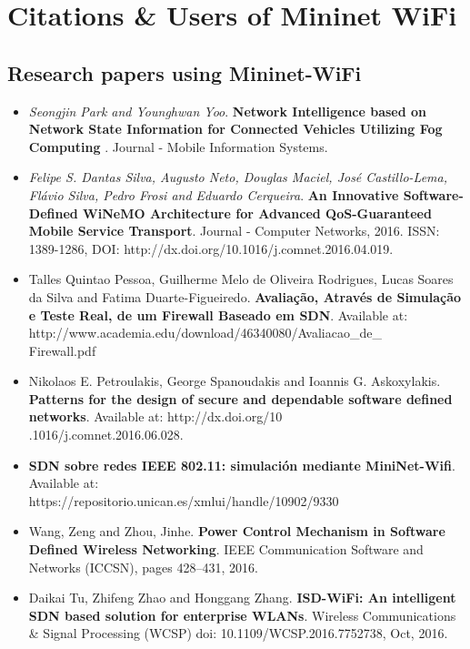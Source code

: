 \chapter{Citations \& Users of Mininet WiFi}

\section{Research papers using Mininet-WiFi}

\begin{itemize}
\item \textit{Seongjin Park and Younghwan Yoo}. \textbf{Network Intelligence based on Network State Information for Connected Vehicles Utilizing Fog Computing
}. Journal - Mobile Information Systems.
\\
\item \textit{Felipe S. Dantas Silva, Augusto Neto, Douglas Maciel, José Castillo-Lema, Flávio Silva, Pedro Frosi and Eduardo Cerqueira}. \textbf{An Innovative Software-Defined WiNeMO Architecture for Advanced QoS-Guaranteed Mobile Service Transport}. Journal - Computer Networks, 2016. ISSN: 1389-1286, DOI: http://dx.doi.org/10.1016/j.comnet.2016.04.019.
\\
\item Talles Quintao Pessoa, Guilherme Melo de Oliveira Rodrigues, Lucas Soares da Silva and Fatima Duarte-Figueiredo. \textbf{Avaliação, Através de Simulação e Teste Real, de um Firewall Baseado em SDN}. Available at: http://www.academia.edu/download/46340080/Avaliacao\_de\_\\Firewall.pdf
\\
\item Nikolaos E. Petroulakis, George Spanoudakis and Ioannis G. Askoxylakis. \textbf{Patterns for the design of secure and dependable software defined networks}. Available at: http://dx.doi.org/10\\.1016/j.comnet.2016.06.028.
\\
\item \textbf{SDN sobre redes IEEE 802.11: simulación mediante MiniNet-Wifi}. Available at:\\ https://repositorio.unican.es/xmlui/handle/10902/9330
\\
\item Wang, Zeng and Zhou, Jinhe. \textbf{Power Control Mechanism in Software Defined Wireless Networking}. IEEE Communication Software and Networks (ICCSN), pages 428--431, 2016.\\

\item  Daikai Tu, Zhifeng Zhao and Honggang Zhang. \textbf{ISD-WiFi: An intelligent SDN based solution for enterprise WLANs}.  Wireless Communications \& Signal Processing (WCSP) doi: 10.1109/WCSP.2016.7752738, Oct, 2016.

\end{itemize}


